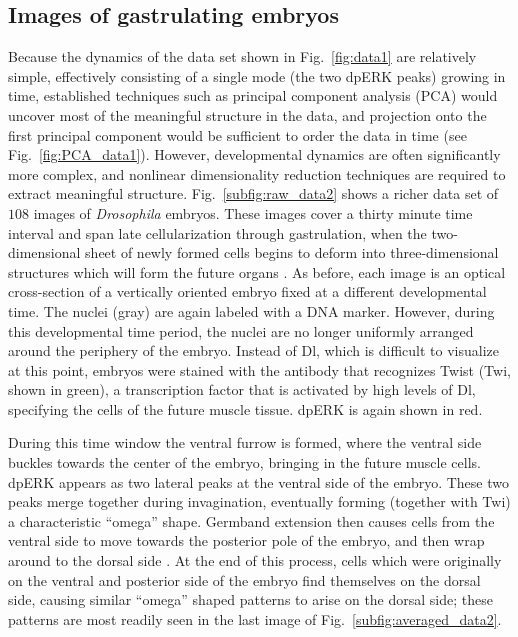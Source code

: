 \documentclass{pnastwo}
\newcommand{\fig}[0]{Fig.}
\begin{document}
\begin{article}
%

\subsection{Images of gastrulating embryos}

%
Because the dynamics of the data set shown in \fig~\ref{fig:data1} are relatively simple, effectively consisting of a single mode (the two dpERK peaks) growing in time, established techniques such as principal component analysis (PCA) \cite{shlens2005tutorial} would uncover most of the meaningful structure in the data, and projection onto the first principal component would be sufficient to order the data in time (see \fig~\ref{fig:PCA_data1}).
%
However, developmental dynamics are often significantly more complex, and nonlinear dimensionality reduction techniques are required to extract meaningful structure.
%
\fig~\ref{subfig:raw_data2} shows a richer data set of $108$ images of {\it Drosophila} embryos.
%
These images cover a thirty minute time interval and span late cellularization through gastrulation, when the two-dimensional sheet of newly formed cells begins to deform into three-dimensional structures which will form the future organs \cite{leptin2005gastrulation}.
%
As before, each image is an optical cross-section of a vertically oriented embryo fixed at a different developmental time.
%
The nuclei (gray) are again labeled with a DNA marker.
%
However, during this developmental time period, the nuclei are no longer uniformly arranged around the periphery of the embryo.
%
Instead of Dl, which is difficult to visualize at this point, embryos were stained with the antibody that recognizes Twist (Twi, shown in green), a transcription factor that is activated by high levels of Dl, specifying the cells of the future muscle tissue.
%
dpERK is again shown in red.

%
During this time window the ventral furrow is formed, where the ventral side buckles towards the center of the embryo, bringing in the future muscle cells.
%
dpERK appears as two lateral peaks at the ventral side of the embryo.
%
These two peaks merge together during invagination, eventually forming (together with Twi) a characteristic ``omega'' shape.
%
Germband extension then causes cells from the ventral side to move towards the posterior pole of the embryo, and then wrap around to the dorsal side \cite{leptin2005gastrulation}.
%
At the end of this process, cells which were originally on the ventral and posterior side of the embryo find themselves on the dorsal side, causing similar ``omega'' shaped patterns to arise on the dorsal side; these patterns are most readily seen in the last image of \fig~\ref{subfig:averaged_data2}.


\end{article}
\end{document}
